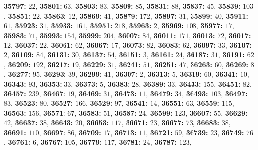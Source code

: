 \textsf{\bfseries 35797:} $22$, \textsf{\bfseries 35801:} $63$, \textsf{\bfseries 35803:} $83$, \textsf{\bfseries 35809:} $85$, \textsf{\bfseries 35831:} $88$, \textsf{\bfseries 35837:} $45$, \textsf{\bfseries 35839:} $103$, \textsf{\bfseries 35851:} $22$, \textsf{\bfseries 35863:} $12$, \textsf{\bfseries 35869:} $41$, \textsf{\bfseries 35879:} $172$, \textsf{\bfseries 35897:} $31$, \textsf{\bfseries 35899:} $40$, \textsf{\bfseries 35911:} $61$, \textsf{\bfseries 35923:} $31$, \textsf{\bfseries 35933:} $161$, \textsf{\bfseries 35951:} $218$, \textsf{\bfseries 35963:} $2$, \textsf{\bfseries 35969:} $108$, \textsf{\bfseries 35977:} $17$, \textsf{\bfseries 35983:} $71$, \textsf{\bfseries 35993:} $154$, \textsf{\bfseries 35999:} $204$, \textsf{\bfseries 36007:} $84$, \textsf{\bfseries 36011:} $171$, \textsf{\bfseries 36013:} $72$, \textsf{\bfseries 36017:} $12$, \textsf{\bfseries 36037:} $22$, \textsf{\bfseries 36061:} $62$, \textsf{\bfseries 36067:} $17$, \textsf{\bfseries 36073:} $82$, \textsf{\bfseries 36083:} $62$, \textsf{\bfseries 36097:} $33$, \textsf{\bfseries 36107:} $2$, \textsf{\bfseries 36109:} $84$, \textsf{\bfseries 36131:} $30$, \textsf{\bfseries 36137:} $54$, \textsf{\bfseries 36151:} $3$, \textsf{\bfseries 36161:} $24$, \textsf{\bfseries 36187:} $31$, \textsf{\bfseries 36191:} $62$, \textsf{\bfseries 36209:} $192$, \textsf{\bfseries 36217:} $19$, \textsf{\bfseries 36229:} $31$, \textsf{\bfseries 36241:} $51$, \textsf{\bfseries 36251:} $47$, \textsf{\bfseries 36263:} $60$, \textsf{\bfseries 36269:} $8$, \textsf{\bfseries 36277:} $95$, \textsf{\bfseries 36293:} $39$, \textsf{\bfseries 36299:} $41$, \textsf{\bfseries 36307:} $2$, \textsf{\bfseries 36313:} $5$, \textsf{\bfseries 36319:} $60$, \textsf{\bfseries 36341:} $10$, \textsf{\bfseries 36343:} $93$, \textsf{\bfseries 36353:} $33$, \textsf{\bfseries 36373:} $5$, \textsf{\bfseries 36383:} $28$, \textsf{\bfseries 36389:} $33$, \textsf{\bfseries 36433:} $155$, \textsf{\bfseries 36451:} $82$, \textsf{\bfseries 36457:} $239$, \textsf{\bfseries 36467:} $19$, \textsf{\bfseries 36469:} $31$, \textsf{\bfseries 36473:} $11$, \textsf{\bfseries 36479:} $34$, \textsf{\bfseries 36493:} $103$, \textsf{\bfseries 36497:} $83$, \textsf{\bfseries 36523:} $80$, \textsf{\bfseries 36527:} $166$, \textsf{\bfseries 36529:} $97$, \textsf{\bfseries 36541:} $14$, \textsf{\bfseries 36551:} $63$, \textsf{\bfseries 36559:} $115$, \textsf{\bfseries 36563:} $156$, \textsf{\bfseries 36571:} $67$, \textsf{\bfseries 36583:} $51$, \textsf{\bfseries 36587:} $24$, \textsf{\bfseries 36599:} $123$, \textsf{\bfseries 36607:} $55$, \textsf{\bfseries 36629:} $42$, \textsf{\bfseries 36637:} $38$, \textsf{\bfseries 36643:} $20$, \textsf{\bfseries 36653:} $117$, \textsf{\bfseries 36671:} $23$, \textsf{\bfseries 36677:} $73$, \textsf{\bfseries 36683:} $38$, \textsf{\bfseries 36691:} $110$, \textsf{\bfseries 36697:} $86$, \textsf{\bfseries 36709:} $17$, \textsf{\bfseries 36713:} $11$, \textsf{\bfseries 36721:} $59$, \textsf{\bfseries 36739:} $23$, \textsf{\bfseries 36749:} $76$, \textsf{\bfseries 36761:} $6$, \textsf{\bfseries 36767:} $105$, \textsf{\bfseries 36779:} $117$, \textsf{\bfseries 36781:} $24$, \textsf{\bfseries 36787:} $123$, 
